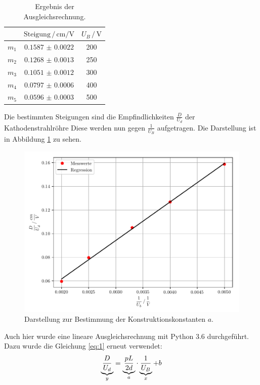 \begin{table}[H]
  \centering
  \caption{Ergebnis der Ausgleichsrechnung.}
  \label{tab:2}
  \begin{tabular}{c c c}
\toprule
&$\text{Steigung} \,/\, \si{\centi\meter\per\volt}$& $U_B \, /\, \si{\volt}$\\
\midrule
$m_1$ & $\num{0.1587(22)}$& 200\\
$m_2$ & $\num{0.1268(13)}$& 250\\
$m_3$ & $\num{0.1051(12)}$& 300\\
$m_4$ & $\num{0.0797(6)}$ & 400\\
$m_5$ & $\num{0.0596(3)}$ & 500\\
\bottomrule
  \end{tabular}
\end{table}
Die bestimmten Steigungen sind die Empfindlichkeiten $\frac{D}{U_d}$ der Kathodenstrahlröhre
Diese werden nun gegen $\frac{1}{U_B}$ aufgetragen.
Die Darstellung ist in Abbildung \ref{abb:7} zu sehen.
\begin{figure}[H]
  \centering
  \includegraphics[width=\textwidth]{plot2.pdf}
  \caption{Darstellung zur Bestimmung der Konstruktionskonstanten $a$.}
  \label{abb:7}
\end{figure}
Auch hier wurde eine lineare Ausgleichsrechnung mit Python 3.6 durchgeführt.
Dazu wurde die Gleichung \ref{eq:1} erneut verwendet:
\begin{equation*}
  \underbrace{\frac{D}{U_d}}_{\mathclap{y}} = \underbrace{\frac{pL}{2d}}_{\mathclap{a}} \cdot \underbrace{\frac{1}{U_B}}_{\mathclap{x}} + b
\end{equation*}
